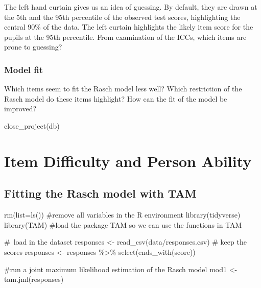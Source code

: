 \documentclass[
  letterpaper,
  DIV=11,
  numbers=noendperiod]{scrreprt}
\newenvironment{Shaded}{\begin{snugshade}}{\end{snugshade}}
\newcommand{\AttributeTok}[1]{\textcolor[rgb]{0.40,0.45,0.13}{#1}}
\newcommand{\CommentTok}[1]{\textcolor[rgb]{0.37,0.37,0.37}{#1}}
\newcommand{\FunctionTok}[1]{\textcolor[rgb]{0.28,0.35,0.67}{#1}}
\newcommand{\NormalTok}[1]{\textcolor[rgb]{0.00,0.23,0.31}{#1}}
\newcommand{\OtherTok}[1]{\textcolor[rgb]{0.00,0.23,0.31}{#1}}
\newcommand{\SpecialCharTok}[1]{\textcolor[rgb]{0.37,0.37,0.37}{#1}}
\newcommand{\StringTok}[1]{\textcolor[rgb]{0.13,0.47,0.30}{#1}}
\begin{document}
The left hand curtain gives us an idea of guessing. By default, they are
drawn at the 5th and the 95th percentile of the observed test scores,
highlighting the central 90\% of the data. The left curtain highlights
the likely item score for the pupils at the 95th percentile. From
examination of the ICCs, which items are prone to guessing?

\hypertarget{model-fit}{%
\subsection{Model fit}\label{model-fit}}

Which items seem to fit the Rasch model less well? Which restriction of
the Rasch model do these items highlight? How can the fit of the model
be improved?

\begin{Shaded}
\begin{Highlighting}[]
\FunctionTok{close\_project}\NormalTok{(db)}
\end{Highlighting}
\end{Shaded}

\hypertarget{item-difficulty-and-person-ability}{%
\chapter{Item Difficulty and Person
Ability}\label{item-difficulty-and-person-ability}}

\hypertarget{fitting-the-rasch-model-with-tam}{%
\section{Fitting the Rasch model with
TAM}\label{fitting-the-rasch-model-with-tam}}

\begin{Shaded}
\begin{Highlighting}[]
\FunctionTok{rm}\NormalTok{(}\AttributeTok{list=}\FunctionTok{ls}\NormalTok{())  }\CommentTok{\#remove all variables in the R environment}
\FunctionTok{library}\NormalTok{(tidyverse)}
\FunctionTok{library}\NormalTok{(TAM)  }\CommentTok{\#load the package TAM so we can use the functions in TAM}

\CommentTok{\# load in the dataset}
\NormalTok{responses }\OtherTok{\textless{}{-}} \FunctionTok{read\_csv}\NormalTok{(}\StringTok{\textquotesingle{}data/responses.csv\textquotesingle{}}\NormalTok{)}
\CommentTok{\# keep the scores}
\NormalTok{responses }\OtherTok{\textless{}{-}}\NormalTok{ responses }\SpecialCharTok{\%\textgreater{}\%} \FunctionTok{select}\NormalTok{(}\FunctionTok{ends\_with}\NormalTok{(}\StringTok{\textquotesingle{}score\textquotesingle{}}\NormalTok{))}

\CommentTok{\#run a joint maximum likelihood estimation of the Rasch model}
\NormalTok{mod1 }\OtherTok{\textless{}{-}} \FunctionTok{tam.jml}\NormalTok{(responses)}
\end{Highlighting}
\end{Shaded}
\end{document}
